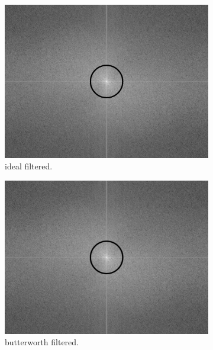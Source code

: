 \documentclass[14pt]{article}
\begin{document}
		\begin{figure}[hbt!]
			\centering
			\begin{subfigure}[b]{0.3\linewidth}
				\includegraphics[width=\linewidth]{ideal_filtered_spec_man.png}
				\caption{ideal filtered.}
			\end{subfigure}
			\begin{subfigure}[b]{0.3\linewidth}
				\includegraphics[width=\linewidth]{btw_filtered_spec_man.png}
				\caption{butterworth filtered.}
			\end{subfigure}
			\begin{subfigure}[b]{0.3\linewidth}

\end{subfigure}
\end{figure}
\end{document}
